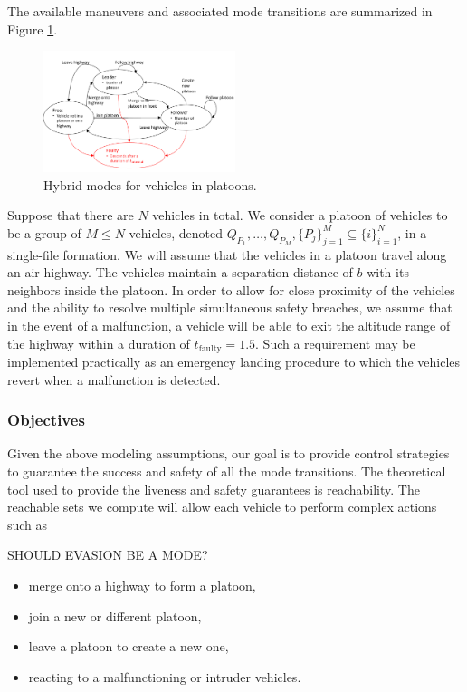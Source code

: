 The available maneuvers and associated mode transitions are summarized in Figure \ref{fig:vehicleModes}.

\begin{figure}
	\centering
	\includegraphics[width=0.5\textwidth]{"fig/vehicleModes"}
	\caption{Hybrid modes for vehicles in platoons.}
	\label{fig:vehicleModes}
\end{figure}

Suppose that there are $N$ vehicles in total. We consider a platoon of vehicles to be a group of $M\le N$ vehicles, denoted $Q_{P_1}, \ldots, Q_{P_M}, \{P_j\}_{j=1}^M \subseteq \{i\}_{i=1}^N$, in a single-file formation. We will assume that the vehicles in a platoon travel along an air highway. The vehicles maintain a separation distance of $b$ with its neighbors inside the platoon. In order to allow for close proximity of the vehicles and the ability to resolve multiple simultaneous safety breaches, we assume that in the event of a malfunction, a vehicle will be able to exit the altitude range of the highway within a duration of $t_\text{faulty}=1.5$. Such a requirement may be implemented practically as an emergency landing procedure to which the vehicles revert when a malfunction is detected.

\subsubsection{Objectives}
Given the above modeling assumptions, our goal is to provide control strategies to guarantee the success and safety of all the mode transitions. The theoretical tool used to provide the liveness and safety guarantees is reachability. The reachable sets we compute will allow each vehicle to perform complex actions such as 

SHOULD EVASION BE A MODE?

\begin{itemize}
\item merge onto a highway to form a platoon,
\item join a new or different platoon,
\item leave a platoon to create a new one,
\item reacting to a malfunctioning or intruder vehicles.
\end{itemize}

